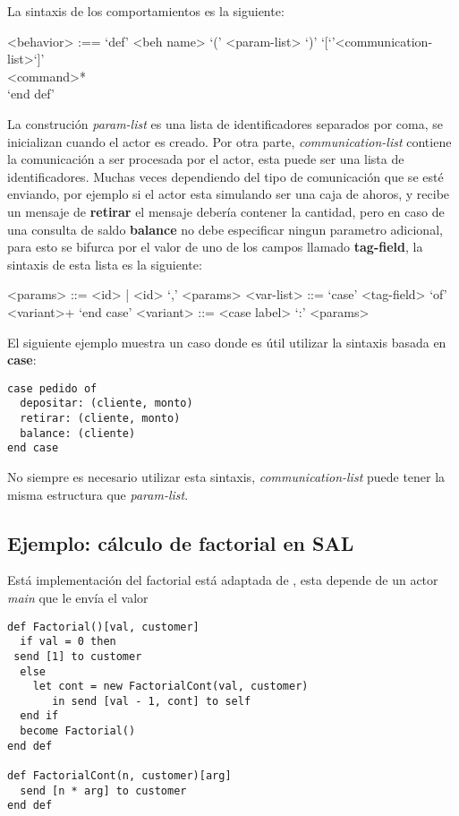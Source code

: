 \documentclass[fleqn]{article}
\begin{document}
La sintaxis de los comportamientos es la siguiente:

\begin{grammar}
  <behavior> :== `def' <beh name> `(' <param-list> `)' `[`'<communication-list>`]' \\
            <command>* \\
  `end def'
\end{grammar}

La construción \textit{param-list} es una lista de identificadores separados por coma,
se inicializan cuando el actor es creado. Por otra parte,
\textit{communication-list} contiene la comunicación a ser procesada por el
actor, esta puede ser una lista de identificadores.
Muchas veces dependiendo del tipo de comunicación que se esté enviando,
por ejemplo si el actor esta simulando ser una caja de ahoros, y recibe
un mensaje de \textbf{retirar} el mensaje debería contener la cantidad, pero en
caso de una consulta de saldo \textbf{balance} no debe especificar ningun parametro
adicional, para esto se bifurca por el valor de uno de los campos llamado
\textbf{tag-field}, la sintaxis de esta lista es la siguiente:

\begin{grammar}
  <params> ::= <id> | <id> `,' <params>
  <var-list> ::= `case' <tag-field> `of' <variant>+ `end case'
  <variant> ::= <case label> `:' <params>
\end{grammar}

El siguiente ejemplo muestra un caso donde es útil utilizar la sintaxis basada
en \textbf{case}:

\begin{lstlisting}[language=sal, style=simple]
case pedido of 
  depositar: (cliente, monto) 
  retirar: (cliente, monto) 
  balance: (cliente) 
end case
\end{lstlisting}

No siempre es necesario utilizar esta sintaxis, \textit{communication-list} puede tener
la misma estructura que \textit{param-list}.

\subsection{Ejemplo: cálculo de factorial en SAL}

Está implementación del factorial está adaptada de \cite{Agha:1986:AMC:7929}, esta
depende de un actor \textit{main} que le envía el valor  

\begin{lstlisting}[language=sal, style=simple]
def Factorial()[val, customer]
  if val = 0 then
 send [1] to customer
  else
    let cont = new FactorialCont(val, customer)
       in send [val - 1, cont] to self
  end if
  become Factorial()
end def

def FactorialCont(n, customer)[arg] 
  send [n * arg] to customer
end def
\end{lstlisting}
\end{document}
